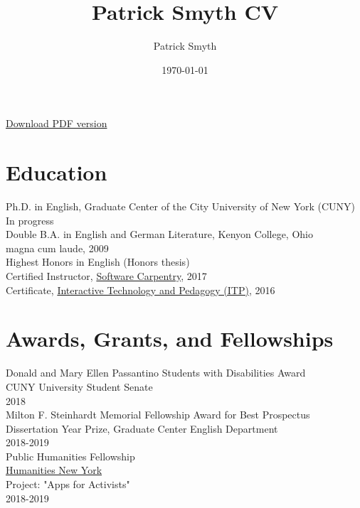 \documentclass[11pt]{article}
\author{Patrick Smyth}
\date{\today}
\title{Patrick Smyth CV}
\begin{document}
\maketitle
\href{https://github.com/smythp/cv/raw/master/cv.pdf}{Download PDF version}\\
\section*{Education}
\label{sec:orgheadline1}
Ph.D. in English, Graduate Center of the City University of New York (CUNY)\\
        In progress\\

Double B.A. in English and German Literature, Kenyon College, Ohio\\
        magna cum laude, 2009\\
        Highest Honors in English (Honors thesis)\\

Certified Instructor, \href{https://software-carpentry.org/about/}{Software Carpentry}, 2017\\

Certificate, \href{https://www.gc.cuny.edu/Page-Elements/Academics-Research-Centers-Initiatives/Certificate-Programs/Interactive-Technology-and-Pedagogy}{Interactive Technology and Pedagogy (ITP)}, 2016\\

\section*{Awards, Grants, and Fellowships}
\label{sec:orgheadline2}
Donald and Mary Ellen Passantino Students with Disabilities Award\\
CUNY University Student Senate\\
2018\\

Milton F. Steinhardt Memorial Fellowship Award for Best Prospectus\\
Dissertation Year Prize, Graduate Center English Department\\
2018-2019\\

Public Humanities Fellowship\\
\href{https://humanitiesny.org/}{Humanities New York}\\
Project: "Apps for Activists"\\
2018-2019\\
\end{document}
